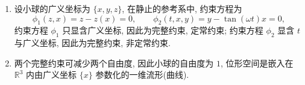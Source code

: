 \begin{solution}\label{problem2-4}
    \begin{enumerate}[label=(\arabic*)]
        \item 设小球的广义坐标为 $\{x, y, z\}$, 在静止的参考系中, 约束方程为
        \[
            \phi_1 (z, x) = z - z(x) = 0, \qquad \phi_2 (t, x, y) = y - \tan (\omega t) x = 0,
        \]
        约束方程 $\phi_1$ 只显含广义坐标, 因此为完整约束, 定常约束; 约束方程 $\phi_2$ 显含 $t$ 与广义坐标, 因此为完整约束, 非定常约束.
        \item 两个完整约束可减少两个自由度, 因此小球的自由度为 $1$, 位形空间是嵌入在 $\mathbb{R}^3$ 内由广义坐标 $\{x\}$ 参数化的一维流形(曲线).
    \end{enumerate}
\end{solution}
